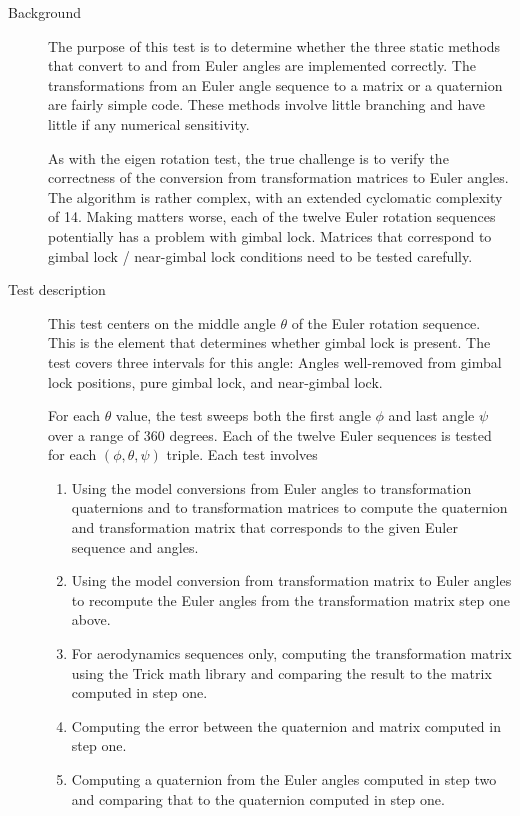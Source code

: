 \label{test:euler}
\begin{description}
\item[Background]
The purpose of this test is to determine whether the three static
methods that convert to and from Euler angles are implemented correctly.
The transformations from an Euler angle sequence to a matrix or a quaternion
are fairly simple code. These methods involve little branching and have little if any numerical sensitivity.

As with the eigen rotation test, the true challenge is to verify the correctness
of the conversion from transformation matrices to Euler angles. The algorithm is
rather complex, with an extended cyclomatic complexity of 14. Making matters
worse, each of the twelve Euler rotation sequences potentially has a problem with
gimbal lock. Matrices that correspond to gimbal lock / near-gimbal lock
conditions need to be tested carefully.

\item[Test description]
This test centers on the middle angle $\theta$ of the Euler rotation sequence.
This is the element that determines whether gimbal lock is present.
The test covers three intervals for this angle: Angles well-removed
from gimbal lock positions, pure gimbal lock, and near-gimbal lock.

For each $\theta$ value, the test sweeps both the first angle $\phi$
and last angle $\psi$ over a range of 360 degrees.
Each of the twelve Euler sequences is tested for each $(\phi, \theta, \psi)$
triple. Each test involves
\begin{enumerate}
\item Using the model conversions from Euler angles to transformation quaternions
and to transformation matrices to compute the quaternion and transformation
matrix that corresponds to the given Euler sequence and angles.
\item Using the model conversion from transformation matrix to Euler angles
to recompute the Euler angles from the transformation matrix step one above.
\item For aerodynamics sequences only,
computing the transformation matrix using the Trick math library and
comparing the result to the matrix computed in step one.
\item Computing the error between the quaternion and matrix computed in step one.
\item Computing a quaternion from the Euler angles computed in step two and
comparing that to the quaternion computed in step one.
\end{enumerate}



\end{description}

